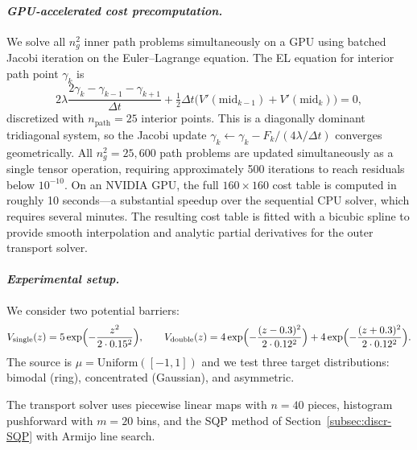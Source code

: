 \documentclass[12pt,leqno]{amsart}
\begin{document}
\paragraph{\it GPU-accelerated cost precomputation.}
We solve all $n_g^2$ inner path problems simultaneously on a GPU using batched Jacobi iteration on the Euler--Lagrange equation.  The EL equation for interior path point $\gamma_k$ is
\[
    2\lambda\frac{2\gamma_k - \gamma_{k-1} - \gamma_{k+1}}{\Delta t} + \tfrac{1}{2}\Delta t\bigl(V'(\text{mid}_{k-1}) + V'(\text{mid}_k)\bigr) = 0,
\]
discretized with $n_{\text{path}} = 25$ interior points.  This is a diagonally dominant tridiagonal system, so the Jacobi update $\gamma_k \leftarrow \gamma_k - F_k / (4\lambda/\Delta t)$ converges geometrically.  All $n_g^2 = 25{,}600$ path problems are updated simultaneously as a single tensor operation, requiring approximately 500 iterations to reach residuals below $10^{-10}$.  On an NVIDIA GPU, the full $160 \times 160$ cost table is computed in roughly 10 seconds---a substantial speedup over the sequential CPU solver, which requires several minutes.  The resulting cost table is fitted with a bicubic spline to provide smooth interpolation and analytic partial derivatives for the outer transport solver.

\paragraph{\it Experimental setup.}
We consider two potential barriers:
\begin{equation}\label{eq:barriers}
    V_{\textup{single}}(z) = 5\exp\Bigl(-\frac{z^2}{2 \cdot 0.15^2}\Bigr), \qquad
    V_{\textup{double}}(z) = 4\exp\Bigl(-\frac{(z-0.3)^2}{2 \cdot 0.12^2}\Bigr) + 4\exp\Bigl(-\frac{(z+0.3)^2}{2 \cdot 0.12^2}\Bigr).
\end{equation}
The source is $\mu = \text{Uniform}([-1,1])$ and we test three target distributions: bimodal (ring), concentrated (Gaussian), and asymmetric.

The transport solver uses piecewise linear maps with $n = 40$ pieces, histogram pushforward with $m = 20$ bins, and the SQP method of Section~\ref{subsec:discr-SQP} with Armijo line search.
\end{document}
